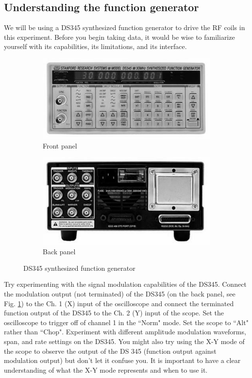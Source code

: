 \documentclass[11pt]{article}
\begin{document}
\subsection{Understanding the function generator}
We will be using a DS345 synthesized function generator to drive the RF coils in this experiment. Before you begin taking data, it would be wise to familiarize yourself with its capabilities, its limitations, and its interface.

\begin{figure}
\begin{subfigure}{0.5\textwidth}
	\centering
	\includegraphics[width=0.8\linewidth]{figures/OPTimage004.jpg}
	\caption{Front panel}
\end{subfigure}
\begin{subfigure}{0.5\textwidth}
	\centering
	\includegraphics[width=0.8\linewidth]{figures/OPTimage005.jpg}
	\caption{Back panel}
\end{subfigure}
\caption{DS345 synthesized function generator}
\label{fig:funcgen}
\end{figure}


Try experimenting with the signal modulation capabilities of the DS345. Connect the modulation output (not terminated) of the DS345 (on the back panel, see Fig. \ref{fig:funcgen}) to the Ch. 1 (X) input of the oscilloscope and connect the terminated function output of the DS345 to the Ch. 2 (Y) input of the scope. Set the oscilloscope to trigger off of channel 1 in the ``Norm" mode. Set the scope to ``Alt" rather than ``Chop". Experiment with different amplitude modulation waveforms, span, and rate settings on the DS345. You might also try using the X-Y mode of the scope to observe the output of the DS 345 (function output against modulation output) but don't let it confuse you. It is important to have a clear understanding of what the X-Y mode represents and when to use it.
\end{document}
